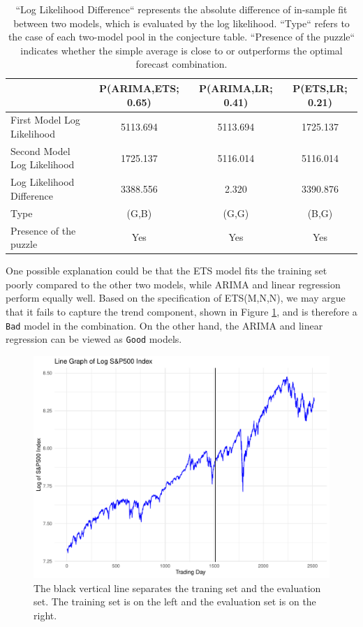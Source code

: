 \documentclass{monashthesis}
\begin{document}
\begin{table}[ht]
  \centering
    \begin{tabular}{l|ccc}
    \toprule
                                    & P(ARIMA,ETS; 0.65) & P(ARIMA,LR; 0.41) & P(ETS,LR; 0.21) \\  
    \midrule
    First Model Log Likelihood      &     5113.694       &      5113.694     &   1725.137      \\
    Second Model Log Likelihood     &     1725.137       &      5116.014     &   5116.014      \\
    Log Likelihood Difference       &     3388.556       &       2.320       &   3390.876      \\
    Type                            &       (G,B)        &       (G,G)       &     (B,G)       \\
    Presence of the puzzle          &       Yes          &        Yes        &     Yes         \\
    \bottomrule
    \end{tabular}
  \caption{``Log Likelihood Difference`` represents the absolute difference of in-sample fit between two models, which is evaluated by the log likelihood. ``Type`` refers to the case of each two-model pool in the conjecture table. ``Presence of the puzzle`` indicates whether the simple average is close to or outperforms the optimal forecast combination.}
  \label{tab:nonfit}
\end{table}

One possible explanation could be that the ETS model fits the training set poorly compared to the other two models, while ARIMA and linear regression perform equally well. Based on the specification of ETS(M,N,N), we may argue that it fails to capture the trend component, shown in Figure \ref{fig:llg}, and is therefore a \texttt{Bad} model in the combination. On the other hand, the ARIMA and linear regression can be viewed as \texttt{Good} models.

\begin{figure}[ht]
\centering
\includegraphics[scale=0.4]{figures/log_linegraph.pdf}
\caption{The black vertical line separates the traning set and the evaluation set. The training set is on the left and the evaluation set is on the right.}
\label{fig:llg}
\end{figure}
\end{document}
